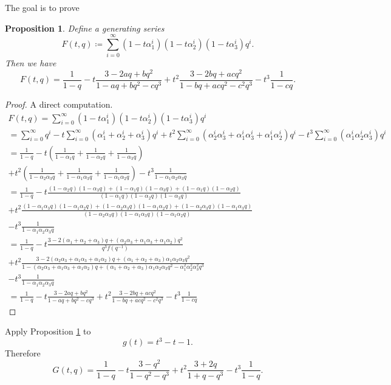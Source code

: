 \documentclass[a4paper]{article}
\newtheorem{Prop}[Thm]{Proposition}
\DeclareMathOperator{\assign}{\coloneqq}        %
\begin{document}
The goal is to prove
\begin{Prop}
\label{prop_generating_function_roots_powers}
Define a generating series
\[
F(t, q) \assign \sum_{i = 0}^\infty 
(1 - t \alpha_1^i)(1 - t \alpha_2^i)(1 - t \alpha_3^i) q^i
.\] 
Then we have 
\[
F(t, q) =
\frac{1}{1 - q}
- t \frac{ 3 - 2 a q + b q^2 }{1 - a q + b q^2 - c q^3}
+ t^2 \frac{ 3 - 2 b q + a c q^2 }{ 1 - b q + a c q^2 - c^2 q^3 }
- t^3 \frac{1}{ 1 - c q}
.\] 
\end{Prop}
\begin{proof}
A direct computation.
\begin{multline}
F(t, q) 
= \sum_{i = 0}^\infty 
(1 - t \alpha_1^i)(1 - t \alpha_2^i)(1 - t \alpha_3^i) q^i
\\ = 
\sum_{i = 0}^\infty  q^i
- t \sum_{i = 0}^\infty (\alpha_1^i + \alpha_2^i +  \alpha_3^i) q^i
+ t^2 \sum_{i = 0}^\infty (\alpha_2^i\alpha_3^i + \alpha_1^i\alpha_3^i + \alpha_1^i\alpha_2^i) q^i
- t^3 \sum_{i = 0}^\infty (\alpha_1^i \alpha_2^i \alpha_3^i) q^i
\\ = 
\frac{1}{1 - q}
- t \left( \frac{1}{1 - \alpha_1 q} + \frac{1}{1 - \alpha_2 q}  + \frac{1}{1 - \alpha_3 q}\right) 
\\ + t^2  \left( \frac{1}{1 - \alpha_2 \alpha_3 q} + \frac{1}{1 - \alpha_1 \alpha_3 q}  + \frac{1}{1 - \alpha_1 \alpha_2 q}\right) 
- t^3 \frac{1}{1 - \alpha_1 \alpha_2 \alpha_3 q}
\\ = 
\frac{1}{1 - q}
- t \frac{{(1 - \alpha_2 q)( 1 - \alpha_3 q) + (1 - \alpha_1 q)( 1 - \alpha_3 q) + (1 - \alpha_1 q)( 1 - \alpha_2 q) }
}{(1 - \alpha_1 q)( 1 - \alpha_2 q)(1 - \alpha_3 q)}
\\ + t^2 \frac{{(1 - \alpha_1\alpha_3 q)( 1 - \alpha_1\alpha_2 q) + (1 - \alpha_2\alpha_3 q)( 1 - \alpha_1\alpha_2 q) + (1 - \alpha_2\alpha_3 q)( 1 - \alpha_1\alpha_3 q) }
}{(1 - \alpha_2\alpha_3 q)( 1 - \alpha_1\alpha_3 q)(1 - \alpha_1\alpha_2 q)}
\\ - t^3 \frac{1}{1 - \alpha_1 \alpha_2 \alpha_3 q}
\\ = 
\frac{1}{1 - q}
- t 
\frac{
	3 - 2 (\alpha_1 + \alpha_2 + \alpha_3) q + (\alpha_2\alpha_3 + \alpha_1\alpha_3 + \alpha_1\alpha_2) q^2
}{q^3 f(q^{-1} )}
\\ + t^2 \frac{
	3 - 2 (\alpha_2 \alpha_3 + \alpha_1 \alpha_3 + \alpha_1 \alpha_2 ) q + (\alpha_1 + \alpha_2 + \alpha_3) \alpha_1 \alpha_2 \alpha_3  q^2
}{
	1 - (\alpha_2 \alpha_3 + \alpha_1 \alpha_3 + \alpha_1 \alpha_2 ) q + (\alpha_1 + \alpha_2 + \alpha_3) \alpha_1 \alpha_2 \alpha_3 q^2 - \alpha_1^2 \alpha_2^2 \alpha_3^2 q^3
}
\\ - t^3 \frac{1}{1 - \alpha_1 \alpha_2 \alpha_3 q}
\\ = 
\frac{1}{1 - q}
- t \frac{ 3 - 2 a q + b q^2 }{1 - a q + b q^2 - c q^3}
+ t^2 \frac{ 3 - 2 b q + a c q^2 }{ 1 - b q + a c q^2 - c^2 q^3 }
- t^3 \frac{1}{1 - c q}
\end{multline}
\end{proof}

Apply Proposition  
\ref{prop_generating_function_roots_powers}
to 
$$g(t) = t^3 - t - 1.$$
Therefore
\[
G(t, q) = 
\frac{1}{1 - q}
- t \frac{ 3 - q^2 }{1 - q^2 - q^3}
+ t^2 \frac{ 3 + 2 q }{ 1 + q - q^3 }
- t^3 \frac{1}{1 - q}
.\] 









\end{document}
